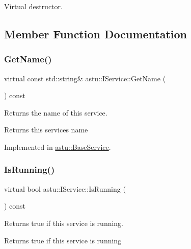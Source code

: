 Virtual destructor. 

\subsection{Member Function Documentation}
\mbox{\label{classastu_1_1IService_a7bfb508c07816c701ceaa72928213380}} 
\subsubsection{\texorpdfstring{Get\+Name()}{GetName()}}
{\footnotesize\ttfamily virtual const std\+::string\& astu\+::\+I\+Service\+::\+Get\+Name (\begin{DoxyParamCaption}{ }\end{DoxyParamCaption}) const\hspace{0.3cm}{\ttfamily [pure virtual]}}

Returns the name of this service.

\begin{DoxyReturn}{Returns}
this service\textquotesingle{}s name 
\end{DoxyReturn}


Implemented in \hyperlink{classastu_1_1BaseService_a42eb6e0d667215ef635682d2a12e1631}{astu\+::\+Base\+Service}.

\mbox{\label{classastu_1_1IService_ab69225f6a613c8829c45d23158fba775}} 
\subsubsection{\texorpdfstring{Is\+Running()}{IsRunning()}}
{\footnotesize\ttfamily virtual bool astu\+::\+I\+Service\+::\+Is\+Running (\begin{DoxyParamCaption}{ }\end{DoxyParamCaption}) const\hspace{0.3cm}{\ttfamily [pure virtual]}}

Returns {\ttfamily true} if this service is running.

\begin{DoxyReturn}{Returns}
{\ttfamily true} if this service is running 
\end{DoxyReturn}


